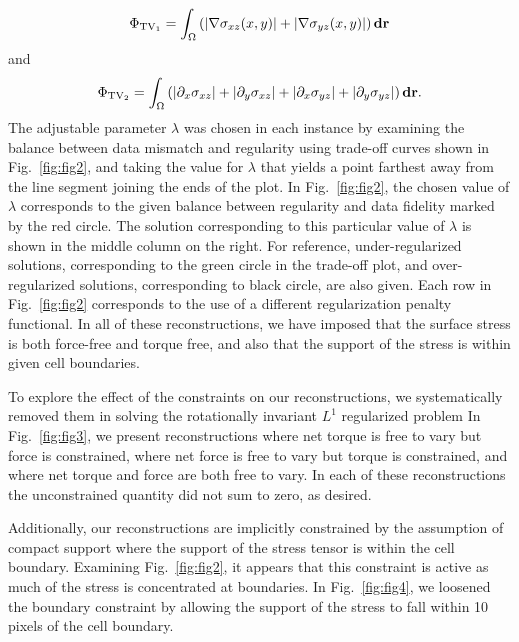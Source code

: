 \documentclass[aps,prl,reprint,twocolumn,groupedaddress,showpacs]{revtex4}
\def\d{{\bf d}}
\def\r{{\bf r}}
\begin{document}
\begin{equation}
 \Phi_{{\rm TV}_1} = \int_\Omega \left( \vert\nabla\sigma_{xz}(x,y) \vert +
 \vert\nabla\sigma_{yz}(x,y) \vert\right)\d\r
 \label{eq:PhiTV1}
\end{equation}
and
\begin{equation}
\Phi_{{\rm TV}_2} = \int_\Omega  \left( \vert\partial_x\sigma_{xz}\vert + \vert\partial_y\sigma_{xz}\vert + \vert\partial_x\sigma_{yz}\vert+ \vert\partial_y\sigma_{yz}\vert\right)\d\r.
 \label{eq:PhiTV2}
\end{equation}
%
The adjustable parameter $\lambda$ was chosen in each instance by
examining the balance between data mismatch and regularity using
trade-off curves shown in Fig.~\ref{fig:fig2}, and taking the value
for $\lambda$ that yields a point farthest away from the line segment
joining the ends of the plot. In Fig.~\ref{fig:fig2}, the chosen value
of $\lambda$ corresponds to the given balance between regularity and
data fidelity marked by the red circle. The solution corresponding to
this particular value of $\lambda$ is shown in the middle column on
the right. For reference, under-regularized solutions, corresponding
to the green circle in the trade-off plot, and over-regularized
solutions, corresponding to black circle, are also given. Each row in
Fig.~\ref{fig:fig2} corresponds to the use of a different
regularization penalty functional. In all of these reconstructions, we
have imposed that the surface stress is both force-free and torque
free, and also that the support of the stress is within given cell
boundaries.

To explore the effect of the constraints on our reconstructions, we
systematically removed them in solving the rotationally invariant
$L^1$ regularized problem In Fig.~\ref{fig:fig3}, we present
reconstructions where net torque is free to vary but force is
constrained, where net force is free to vary but torque is
constrained, and where net torque and force are both free to vary. In
each of these reconstructions the unconstrained quantity did not sum
to zero, as desired.

Additionally, our reconstructions are implicitly constrained by the
assumption of compact support where the support of the stress tensor
is within the cell boundary. Examining Fig.~\ref{fig:fig2}, it appears
that this constraint is active as much of the stress is concentrated
at boundaries. In Fig.~\ref{fig:fig4}, we loosened the boundary
constraint by allowing the support of the stress to fall within 10
pixels of the cell boundary.
\end{document}

